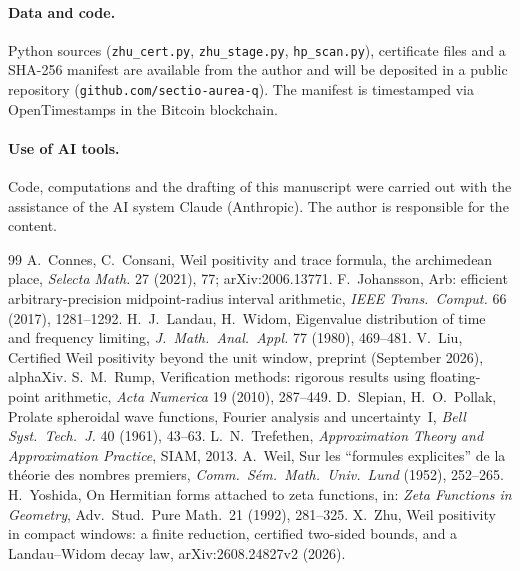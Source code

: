 \documentclass[11pt,a4paper]{article}
\theoremstyle{remark}
\theoremstyle{definition}
\begin{document}
\paragraph{Data and code.} Python sources (\texttt{zhu\_cert.py}, \texttt{zhu\_stage.py}, \texttt{hp\_scan.py}), certificate files and a SHA-256 manifest are available from the author and will be deposited in a public repository (\texttt{github.com/sectio-aurea-q}). The manifest is timestamped via OpenTimestamps in the Bitcoin blockchain.

\paragraph{Use of AI tools.} Code, computations and the drafting of this manuscript were carried out with the assistance of the AI system Claude (Anthropic). The author is responsible for the content.

\begin{thebibliography}{99}\small
{} A.~Connes, C.~Consani, Weil positivity and trace formula, the archimedean place, \emph{Selecta Math.} 27 (2021), 77; arXiv:2006.13771.
 F.~Johansson, Arb: efficient arbitrary-precision midpoint-radius interval arithmetic, \emph{IEEE Trans.\ Comput.} 66 (2017), 1281--1292.
 H.~J.~Landau, H.~Widom, Eigenvalue distribution of time and frequency limiting, \emph{J.\ Math.\ Anal.\ Appl.} 77 (1980), 469--481.
 V.~Liu, Certified Weil positivity beyond the unit window, preprint (September 2026), alphaXiv.
 S.~M.~Rump, Verification methods: rigorous results using floating-point arithmetic, \emph{Acta Numerica} 19 (2010), 287--449.
 D.~Slepian, H.~O.~Pollak, Prolate spheroidal wave functions, Fourier analysis and uncertainty~I, \emph{Bell Syst.\ Tech.\ J.} 40 (1961), 43--63.
 L.~N.~Trefethen, \emph{Approximation Theory and Approximation Practice}, SIAM, 2013.
 A.~Weil, Sur les ``formules explicites'' de la th\'eorie des nombres premiers, \emph{Comm.\ S\'em.\ Math.\ Univ.\ Lund} (1952), 252--265.
 H.~Yoshida, On Hermitian forms attached to zeta functions, in: \emph{Zeta Functions in Geometry}, Adv.\ Stud.\ Pure Math.\ 21 (1992), 281--325.
 X.~Zhu, Weil positivity in compact windows: a finite reduction, certified two-sided bounds, and a Landau--Widom decay law, arXiv:2608.24827v2 (2026).
\end{thebibliography}
\end{document}
